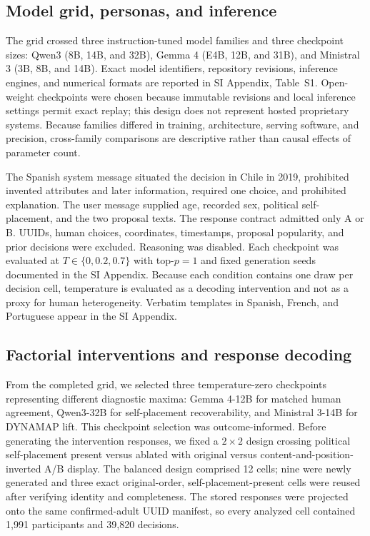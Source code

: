 \documentclass[unnumsec,webpdf,modern,large]{oup-authoring-template}
\begin{document}
\subsection{Model grid, personas, and inference}

The grid crossed three instruction-tuned model families and three checkpoint sizes: Qwen3 (8B, 14B, and 32B), Gemma 4 (E4B, 12B, and 31B), and Ministral 3 (3B, 8B, and 14B). Exact model identifiers, repository revisions, inference engines, and numerical formats are reported in SI Appendix, Table~S1. Open-weight checkpoints were chosen because immutable revisions and local inference settings permit exact replay; this design does not represent hosted proprietary systems. Because families differed in training, architecture, serving software, and precision, cross-family comparisons are descriptive rather than causal effects of parameter count.

The Spanish system message situated the decision in Chile in 2019, prohibited invented attributes and later information, required one choice, and prohibited explanation. The user message supplied age, recorded sex, political self-placement, and the two proposal texts. The response contract admitted only A or B. UUIDs, human choices, coordinates, timestamps, proposal popularity, and prior decisions were excluded. Reasoning was disabled. Each checkpoint was evaluated at $T\in\{0,0.2,0.7\}$ with top-$p=1$ and fixed generation seeds documented in the SI Appendix. Because each condition contains one draw per decision cell, temperature is evaluated as a decoding intervention and not as a proxy for human heterogeneity. Verbatim templates in Spanish, French, and Portuguese appear in the SI Appendix.

\subsection{Factorial interventions and response decoding}

From the completed grid, we selected three temperature-zero checkpoints representing different diagnostic maxima: Gemma 4-12B for matched human agreement, Qwen3-32B for self-placement recoverability, and Ministral 3-14B for DYNAMAP lift. This checkpoint selection was outcome-informed. Before generating the intervention responses, we fixed a $2\times2$ design crossing political self-placement present versus ablated with original versus content-and-position-inverted A/B display. The balanced design comprised 12 cells; nine were newly generated and three exact original-order, self-placement-present cells were reused after verifying identity and completeness. The stored responses were projected onto the same confirmed-adult UUID manifest, so every analyzed cell contained 1,991 participants and 39,820 decisions.
\end{document}

